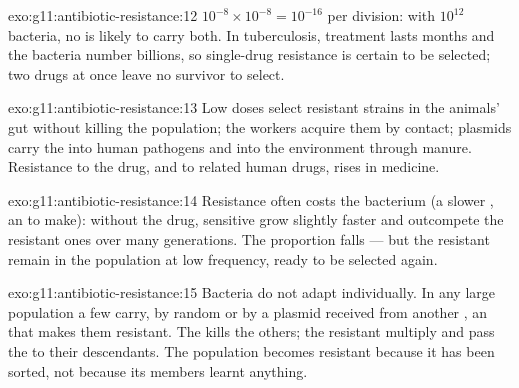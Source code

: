 \begin{solution}{exo:g11:antibiotic-resistance:12}
$10^{-8} \times 10^{-8} = 10^{-16}$ per division: with $10^{12}$
bacteria, no  is likely to carry both. In tuberculosis, treatment
lasts months and the bacteria number billions, so single-drug
resistance is certain to be selected; two drugs at once leave no
survivor to select.
\end{solution}

\begin{solution}{exo:g11:antibiotic-resistance:13}
Low doses select resistant strains in the animals' gut without
killing the population; the workers acquire them by contact; plasmids
carry the  into human pathogens and into the environment through
manure. Resistance to the drug, and to related human drugs, rises in
medicine.
\end{solution}

\begin{solution}{exo:g11:antibiotic-resistance:14}
Resistance often costs the bacterium (a slower , an  to
make): without the drug, sensitive  grow slightly faster and
outcompete the resistant ones over many generations. The proportion
falls --- but the resistant  remain in the population at low
frequency, ready to be selected again.
\end{solution}

\begin{solution}{exo:g11:antibiotic-resistance:15}
Bacteria do not adapt individually. In any large population a few
 carry, by random  or by a plasmid received from
another , an  that makes them resistant. The 
kills the others; the resistant  multiply and pass the 
to their descendants. The population becomes resistant because it
has been sorted, not because its members learnt anything.
\end{solution}

